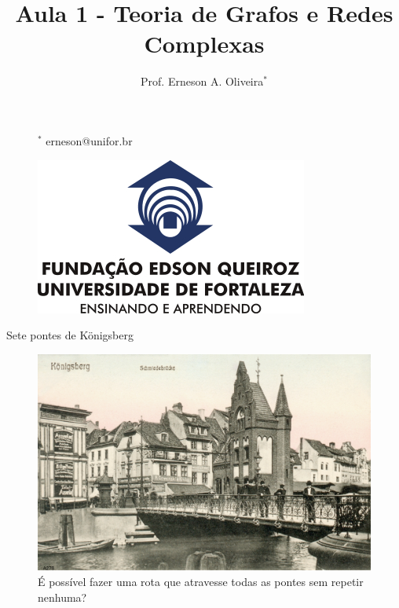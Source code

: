 \documentclass[12pt,mathserif,aspectratio=169]{beamer}
\title[X800 - Mineração em Grafos]{Aula 1 - Teoria de Grafos e Redes Complexas}
\author[Prof. Erneson A. Oliveira]{Prof. Erneson A. Oliveira$^*$}
\institute[MBACD-UNIFOR]{MBA em Ciência de Dados\\Universidade de Fortaleza}
\date{}
\begin{document}
\begin{frame}
    \vspace{1.0cm}
    \titlepage
    \vspace{-1.5cm}
    
    \begin{figure}
        \begin{minipage}{0.4\paperwidth}
            \vspace{1.75cm}
            \begin{flushleft}
                {\tiny $^*$ erneson@unifor.br}
            \end{flushleft}
        \end{minipage}
        \hfill
        \begin{minipage}{0.4\paperwidth}
            \vspace{-0.5cm}
            \begin{flushright}
                \includegraphics[width=0.2\paperwidth]{fig/unifor.jpg}
            \end{flushright}
        \end{minipage}
    \end{figure}
\end{frame}

\begin{frame}{Sete pontes de Königsberg}
    \begin{figure}
        \includegraphics[width=0.6\paperwidth]{fig/konigsberg.jpg}
        \vspace{-0.25cm}
	    \caption{É possível fazer uma rota que atravesse todas as pontes sem repetir nenhuma?}
    \end{figure}
\end{frame}
\end{document}
